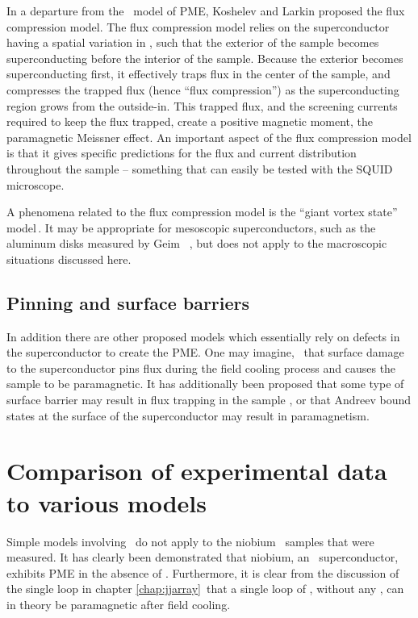 In a departure from the \jja\ model of PME,
Koshelev and Larkin \cite{koshelev_prb_53_13559_1995}
proposed the flux compression model. 
The flux compression model relies on the superconductor having a 
spatial variation in \tc, such that the exterior of the sample
becomes superconducting before the interior of the sample.
Because the exterior becomes superconducting first, it 
effectively traps flux in the center of the sample, and compresses
the trapped flux (hence ``flux compression'') as the 
superconducting region grows
from the outside-in. This trapped flux, and the
screening currents required to keep the flux trapped, create
a positive magnetic moment, the paramagnetic Meissner effect.
An important aspect of the flux compression model is that it gives
specific predictions for the flux and current distribution
throughout the sample -- something that can easily be tested with
the SQUID microscope. 

A phenomena related to the flux compression model is the ``giant
vortex state'' model\,\cite{moshchalkov_prb_55_11793_1999,%
deo_prl_79_4653_1997}. It may be appropriate for mesoscopic
superconductors, such as the aluminum disks measured by Geim \etal\
\cite{geim_nature_396_144_1998}, but does not apply to the 
macroscopic situations discussed here. 

\subsection{Pinning and surface barriers}

In addition there are other proposed models which essentially rely
on defects in the superconductor to create the PME. 
One may imagine, \eg\, that surface damage to the superconductor
pins flux during the field cooling process 
and causes the sample to be paramagnetic. It has
additionally been proposed that some type of surface barrier
may result in flux trapping in the sample \cite{deo_prb_59_6039_1999},
or that 
Andreev bound states at the
surface of the superconductor \cite{prusseit_physc_317_396_1999}
may result in paramagnetism. 

\section{Comparison of experimental data to various models}

Simple models involving \pijunctions\ do not apply to the niobium 
\jja\ samples that were measured. 
It has clearly been demonstrated that niobium, an \swave\ superconductor,
exhibits PME in the absence of \pijunctions. Furthermore, it is
clear from the discussion of the single loop in chapter \ref{chap:jjarray}\
that a single loop of \jjsnoun, without any \pijunctions, can in
theory be paramagnetic after field cooling. 

